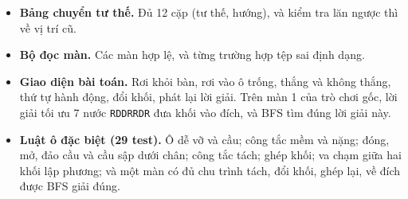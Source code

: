 \begin{itemize}
\item \textbf{Bảng chuyển tư thế.} Đủ 12 cặp (tư thế, hướng), và kiểm tra lăn ngược thì về vị trí cũ.
\item \textbf{Bộ đọc màn.} Các màn hợp lệ, và từng trường hợp tệp sai định dạng.
\item \textbf{Giao diện bài toán.} Rơi khỏi bàn, rơi vào ô trống, thắng và không thắng, thứ tự hành động, đổi khối, phát lại lời giải. Trên màn 1 của trò chơi gốc, lời giải tối ưu 7 nước \texttt{RDDRRDR} đưa khối vào đích, và BFS tìm đúng lời giải này.
\item \textbf{Luật ô đặc biệt (29 test).} Ô dễ vỡ và cầu; công tắc mềm và nặng; đóng, mở, đảo cầu và cầu sập dưới chân; công tắc tách; ghép khối; va chạm giữa hai khối lập phương; và một màn có đủ chu trình tách, đổi khối, ghép lại, về đích được BFS giải đúng.
\end{itemize}
